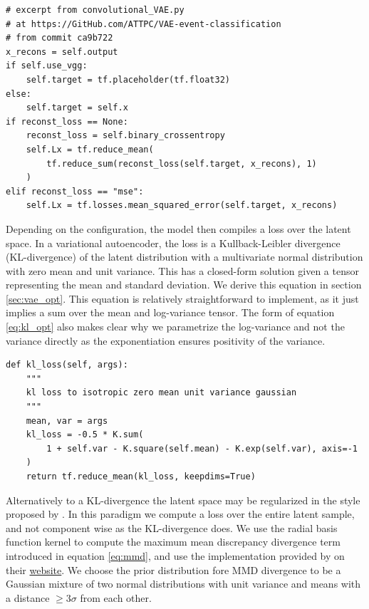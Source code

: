\begin{minipage}{\linewidth}
\begin{lstlisting}[language=iPython]
# excerpt from convolutional_VAE.py
# at https://GitHub.com/ATTPC/VAE-event-classification
# from commit ca9b722
x_recons = self.output
if self.use_vgg:
    self.target = tf.placeholder(tf.float32)
else:
    self.target = self.x
if reconst_loss == None:
    reconst_loss = self.binary_crossentropy
    self.Lx = tf.reduce_mean(
        tf.reduce_sum(reconst_loss(self.target, x_recons), 1)
    )
elif reconst_loss == "mse":
    self.Lx = tf.losses.mean_squared_error(self.target, x_recons)
\end{lstlisting}
\end{minipage}


Depending on the configuration, the model then compiles a loss over the latent space. In a variational autoencoder, the loss is a  Kullback-Leibler divergence (KL-divergence) of the latent distribution with a multivariate normal distribution with zero mean and unit variance. This has a closed-form solution given a tensor representing the mean and standard deviation. We derive this equation in section \ref{sec:vae_opt}. This equation is relatively straightforward to implement, as it just implies a sum over the mean and log-variance tensor. The form of equation \ref{eq:kl_opt} also makes clear why we parametrize the log-variance and not the variance directly as the exponentiation ensures positivity of the variance.


\begin{minipage}{\linewidth}
\begin{lstlisting}[language=iPython]
def kl_loss(self, args):
    """
    kl loss to isotropic zero mean unit variance gaussian
    """
    mean, var = args
    kl_loss = -0.5 * K.sum(
        1 + self.var - K.square(self.mean) - K.exp(self.var), axis=-1
    )
    return tf.reduce_mean(kl_loss, keepdims=True)
\end{lstlisting}
\end{minipage}

Alternatively to a KL-divergence the latent space may be regularized in the style proposed by \citet{Zhao}. In this paradigm we compute a loss over the entire latent sample, and not component wise as the KL-divergence does. We use the radial basis function kernel to compute the maximum mean discrepancy divergence term introduced in equation \ref{eq:mmd}, and use the implementation provided by \cite{Zhao} on their \href{http://szhao.me/2017/06/10/a-tutorial-on-mmd-variational-autoencoders.html}{website}. We choose the prior distribution fore MMD divergence to be a Gaussian mixture of two normal distributions with unit variance and means with a distance $\geq 3\sigma$ from each other. 

